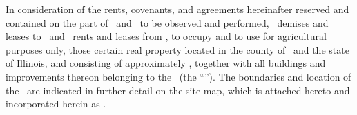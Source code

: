 In consideration of the rents, covenants, and agreements hereinafter reserved and contained on the part of \lessee\ and \lessor\ to be observed and performed, \lessor\ demises and leases to \lessee\ and \lessee\ rents and leases from \lessor, to occupy and to use for agricultural purposes only, those certain real property located in the county of \county\ and the state of Illinois, and consisting of approximately \acres, together with all buildings and improvements thereon belonging to the \lessor\ (the “\property”). The boundaries and location of the \property\ are indicated in further detail on the site map, which is attached hereto and incorporated herein as \exhibitA.
